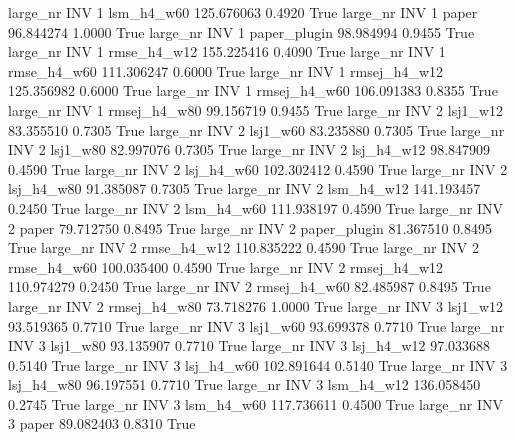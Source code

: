   large_nr      INV                 1   lsm_h4_w60  125.676063      0.4920    True
  large_nr      INV                 1        paper   96.844274      1.0000    True
  large_nr      INV                 1 paper_plugin   98.984994      0.9455    True
  large_nr      INV                 1  rmse_h4_w12  155.225416      0.4090    True
  large_nr      INV                 1  rmse_h4_w60  111.306247      0.6000    True
  large_nr      INV                 1 rmsej_h4_w12  125.356982      0.6000    True
  large_nr      INV                 1 rmsej_h4_w60  106.091383      0.8355    True
  large_nr      INV                 1 rmsej_h4_w80   99.156719      0.9455    True
  large_nr      INV                 2     lsj1_w12   83.355510      0.7305    True
  large_nr      INV                 2     lsj1_w60   83.235880      0.7305    True
  large_nr      INV                 2     lsj1_w80   82.997076      0.7305    True
  large_nr      INV                 2   lsj_h4_w12   98.847909      0.4590    True
  large_nr      INV                 2   lsj_h4_w60  102.302412      0.4590    True
  large_nr      INV                 2   lsj_h4_w80   91.385087      0.7305    True
  large_nr      INV                 2   lsm_h4_w12  141.193457      0.2450    True
  large_nr      INV                 2   lsm_h4_w60  111.938197      0.4590    True
  large_nr      INV                 2        paper   79.712750      0.8495    True
  large_nr      INV                 2 paper_plugin   81.367510      0.8495    True
  large_nr      INV                 2  rmse_h4_w12  110.835222      0.4590    True
  large_nr      INV                 2  rmse_h4_w60  100.035400      0.4590    True
  large_nr      INV                 2 rmsej_h4_w12  110.974279      0.2450    True
  large_nr      INV                 2 rmsej_h4_w60   82.485987      0.8495    True
  large_nr      INV                 2 rmsej_h4_w80   73.718276      1.0000    True
  large_nr      INV                 3     lsj1_w12   93.519365      0.7710    True
  large_nr      INV                 3     lsj1_w60   93.699378      0.7710    True
  large_nr      INV                 3     lsj1_w80   93.135907      0.7710    True
  large_nr      INV                 3   lsj_h4_w12   97.033688      0.5140    True
  large_nr      INV                 3   lsj_h4_w60  102.891644      0.5140    True
  large_nr      INV                 3   lsj_h4_w80   96.197551      0.7710    True
  large_nr      INV                 3   lsm_h4_w12  136.058450      0.2745    True
  large_nr      INV                 3   lsm_h4_w60  117.736611      0.4500    True
  large_nr      INV                 3        paper   89.082403      0.8310    True
